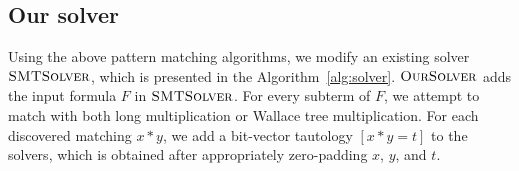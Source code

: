 \subsection{Our solver}


Using the above pattern matching algorithms, we modify an existing
solver $\textsc{SMTSolver}$, which
is presented in the Algorithm~\ref{alg:solver}.
%
$\textsc{OurSolver}$ adds the input formula $F$ in $\textsc{SMTSolver}$.
%
For every subterm of $F$, we attempt to match with both long multiplication
or Wallace tree multiplication.
%
For each discovered matching $x*y$, we add a bit-vector tautology $[x*y = t]$ 
to the solvers, which is obtained after
appropriately zero-padding $x$, $y$, and $t$.
 



